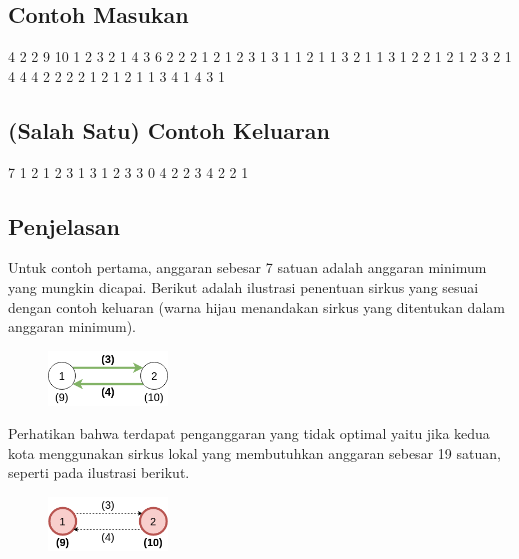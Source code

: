 \documentclass[../main_problemset.tex]{subfiles} %
\begin{document}
\begin{minipage}[t]{0.5\textwidth}
\subsection*{Contoh Masukan}

\begin{lcverbatim}
4
2 2
9 10
1 2 3
2 1 4
3 6
2 2 2
1 2 1
2 3 1
3 1 1
2 1 1
3 2 1
1 3 1
2 2
1 2
1 2 3
2 1 4
4 4
2 2 2 2
1 2 1
2 1 1
3 4 1
4 3 1
\end{lcverbatim}
\end{minipage}
\begin{minipage}[t]{0.5\textwidth}
\subsection*{(Salah Satu) Contoh Keluaran}

\begin{lcverbatim}
7 1
2 1 2
3 1
3 1 2 3
3 0
4 2
2 3 4
2 2 1
\end{lcverbatim}
\end{minipage}

\subsection*{Penjelasan}

Untuk contoh pertama, anggaran sebesar 7 satuan adalah anggaran minimum yang mungkin dicapai. Berikut adalah ilustrasi penentuan sirkus yang sesuai dengan contoh keluaran (warna hijau menandakan sirkus yang ditentukan dalam anggaran minimum).

\begin{figure}[H]
	\centering
	\includegraphics[width=120px]{bis-ddak/asset/Sample_1_OK}
\end{figure}

Perhatikan bahwa terdapat penganggaran yang tidak optimal yaitu jika kedua kota menggunakan sirkus lokal yang membutuhkan anggaran sebesar 19 satuan, seperti pada ilustrasi berikut.

\begin{figure}[H]
	\centering
	\includegraphics[width=120px]{bis-ddak/asset/Sample_1_NOT_OK}
\end{figure}
\end{document}
